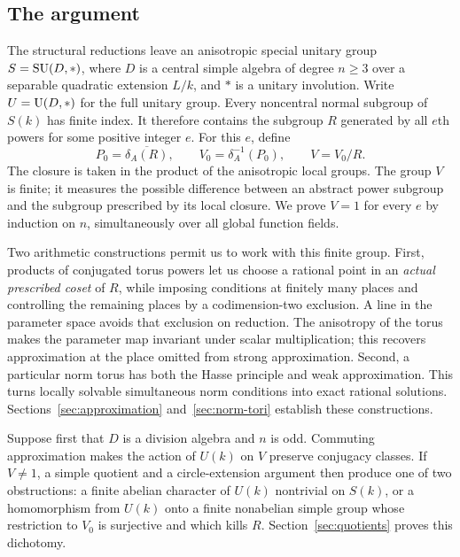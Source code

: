 \subsection{The argument}

The structural reductions leave an anisotropic special unitary group
$S=\operatorname{SU}(D,*)$, where $D$ is a central simple algebra of degree $n\geq3$
over a separable quadratic extension $L/k$, and $*$ is a unitary
involution. Write $U=\operatorname{U}(D,*)$ for the full unitary group. Every noncentral
normal subgroup of $S(k)$ has finite index. It therefore contains the
subgroup $R$ generated by all $e$th powers for some positive integer $e$.
For this $e$, define
\[
 P_0=\overline{\delta_A(R)},\qquad
 V_0=\delta_A^{-1}(P_0),\qquad V=V_0/R.
\]
The closure is taken in the product of the anisotropic local groups.
The group $V$ is finite; it measures the possible difference between an
abstract power subgroup and the subgroup prescribed by its local closure.
We prove $V=1$ for every $e$ by induction on $n$, simultaneously over all
global function fields.

Two arithmetic constructions permit us to work with this finite group.
First, products of conjugated torus powers let us choose a rational point
in an \emph{actual prescribed coset} of $R$, while imposing conditions at
finitely many places and controlling the remaining places by a
codimension-two exclusion. A line in the parameter space avoids that
exclusion on reduction. The anisotropy of the torus makes the parameter
map invariant under scalar multiplication; this recovers approximation
at the place omitted from strong approximation. Second, a particular norm
torus has both the Hasse principle and weak approximation. This turns
locally solvable simultaneous norm conditions into exact rational
solutions. Sections~\ref{sec:approximation} and~\ref{sec:norm-tori}
establish these constructions.

Suppose first that $D$ is a division algebra and $n$ is odd. Commuting
approximation makes the action of $U(k)$ on $V$ preserve conjugacy
classes. If $V\ne1$, a simple quotient and a circle-extension argument
then produce one of two obstructions: a finite abelian character of
$U(k)$ nontrivial on $S(k)$, or a homomorphism from $U(k)$ onto a finite
nonabelian simple group whose restriction to $V_0$ is surjective and
which kills $R$. Section~\ref{sec:quotients} proves this dichotomy.

